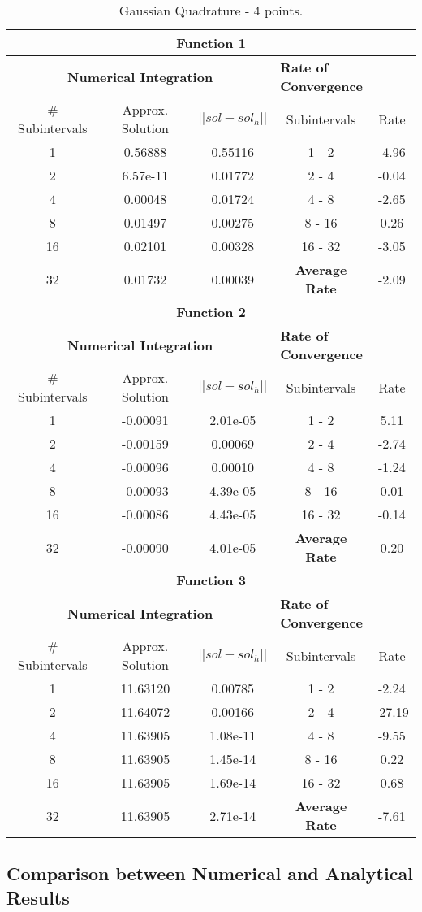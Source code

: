 \begin{table}[H]
    \centering
    \caption{Gaussian Quadrature - 4 points.}
    \begin{tabular}{ccccc}
    \hline
    \multicolumn{5}{c}{\textbf{Function 1}} \\
    \hline
    \multicolumn{3}{c}{\textbf{Numerical Integration}} & \multicolumn{2}{l}{\textbf{Rate of Convergence}} \\\hline
    \# Subintervals & Approx. Solution & $|| sol - sol_h ||$ & Subintervals & Rate \\\hline
    1 & 0.56888 & 0.55116 & 1 - 2 &  -4.96\\
    2 & 6.57e-11 & 0.01772 & 2 - 4 &  -0.04\\
    4 & 0.00048 & 0.01724 & 4 - 8 &  -2.65\\
    8 & 0.01497 & 0.00275 & 8 - 16 &  0.26\\
    16 & 0.02101 & 0.00328 & 16 - 32 &  -3.05\\
    32 & 0.01732 & 0.00039 & \textbf{Average Rate} & -2.09\\ \hline
    \multicolumn{5}{c}{\textbf{Function 2}} \\
    \hline
    \multicolumn{3}{c}{\textbf{Numerical Integration}} & \multicolumn{2}{l}{\textbf{Rate of Convergence}} \\\hline
    \# Subintervals & Approx. Solution & $|| sol - sol_h ||$ & Subintervals & Rate \\\hline
    1 & -0.00091 & 2.01e-05 & 1 - 2 &  5.11\\
    2 & -0.00159 & 0.00069 & 2 - 4 &  -2.74\\
    4 & -0.00096 & 0.00010 & 4 - 8 &  -1.24\\
    8 & -0.00093 & 4.39e-05 & 8 - 16 &  0.01\\
    16 & -0.00086 & 4.43e-05 & 16 - 32 &  -0.14\\
    32 & -0.00090 & 4.01e-05 & \textbf{Average Rate} & 0.20\\ \hline
    \multicolumn{5}{c}{\textbf{Function 3}} \\
    \hline
    \multicolumn{3}{c}{\textbf{Numerical Integration}} & \multicolumn{2}{l}{\textbf{Rate of Convergence}} \\\hline
    \# Subintervals & Approx. Solution & $|| sol - sol_h ||$ & Subintervals & Rate \\\hline
    1 & 11.63120 & 0.00785 & 1 - 2 &  -2.24\\
    2 & 11.64072 & 0.00166 & 2 - 4 &  -27.19\\
    4 & 11.63905 & 1.08e-11 & 4 - 8 &  -9.55\\
    8 & 11.63905 & 1.45e-14 & 8 - 16 &  0.22\\
    16 & 11.63905 & 1.69e-14 & 16 - 32 &  0.68\\
    32 & 11.63905 & 2.71e-14 & \textbf{Average Rate} & -7.61\\ \hline
\end{tabular}
\end{table}

\subsection{Comparison between Numerical and Analytical Results}
